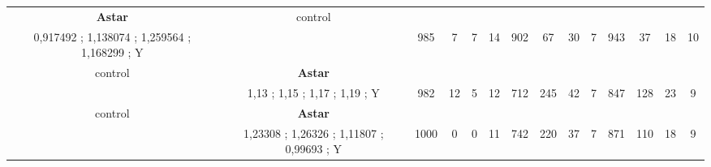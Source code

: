 \begin{table}[H]
{\begin{tabular}{|c|c|c|c|c|c|c|c|c|c|c|c|c|c|}
\cellcolor{blue!15}\textbf{Astar} & control& {\color[HTML]{00009B} } & {\color[HTML]{9A0000} } & {\color[HTML]{009901} } &  & {\color[HTML]{00009B} } & {\color[HTML]{9A0000} } & {\color[HTML]{009901} } &  & {\color[HTML]{00009B} } & {\color[HTML]{9A0000} } & {\color[HTML]{009901} } &  \\ 
\cellcolor{ blue!15}0,917492 ; 1,138074 ; 1,259564 ; 1,168299 ; Y &  & \multirow{-2}{*}{{\color[HTML]{00009B} 985}} & \multirow{-2}{*}{{\color[HTML]{9A0000} 7}} & \multirow{-2}{*}{{\color[HTML]{009901} 7}} & \multirow{-2}{*}{14} & \multirow{-2}{*}{{\color[HTML]{00009B} 902}} & \multirow{-2}{*}{{\color[HTML]{9A0000} 67}} & \multirow{-2}{*}{{\color[HTML]{009901} 30}} & \multirow{-2}{*}{7} & \multirow{-2}{*}{{\color[HTML]{00009B} 943}} & \multirow{-2}{*}{{\color[HTML]{9A0000} 37}} & \multirow{-2}{*}{{\color[HTML]{009901} 18}} & \multirow{-2}{*}{10} \\ \hline

control & \cellcolor{blue!15}\textbf{Astar}& {\color[HTML]{00009B} } & {\color[HTML]{9A0000} } & {\color[HTML]{009901} } &  & {\color[HTML]{00009B} } & {\color[HTML]{9A0000} } & {\color[HTML]{009901} } &  & {\color[HTML]{00009B} } & {\color[HTML]{9A0000} } & {\color[HTML]{009901} } &  \\ 
 & \cellcolor{ blue!15}1,13 ; 1,15 ; 1,17 ; 1,19 ; Y & \multirow{-2}{*}{{\color[HTML]{00009B} 982}} & \multirow{-2}{*}{{\color[HTML]{9A0000} 12}} & \multirow{-2}{*}{{\color[HTML]{009901} 5}} & \multirow{-2}{*}{12} & \multirow{-2}{*}{{\color[HTML]{00009B} 712}} & \multirow{-2}{*}{{\color[HTML]{9A0000} 245}} & \multirow{-2}{*}{{\color[HTML]{009901} 42}} & \multirow{-2}{*}{7} & \multirow{-2}{*}{{\color[HTML]{00009B} 847}} & \multirow{-2}{*}{{\color[HTML]{9A0000} 128}} & \multirow{-2}{*}{{\color[HTML]{009901} 23}} & \multirow{-2}{*}{9} \\ \hline

control & \cellcolor{blue!15}\textbf{Astar}& {\color[HTML]{00009B} } & {\color[HTML]{9A0000} } & {\color[HTML]{009901} } &  & {\color[HTML]{00009B} } & {\color[HTML]{9A0000} } & {\color[HTML]{009901} } &  & {\color[HTML]{00009B} } & {\color[HTML]{9A0000} } & {\color[HTML]{009901} } &  \\ 
 & \cellcolor{ blue!15}1,23308 ; 1,26326 ; 1,11807 ; 0,99693 ; Y & \multirow{-2}{*}{{\color[HTML]{00009B} 1000}} & \multirow{-2}{*}{{\color[HTML]{9A0000} 0}} & \multirow{-2}{*}{{\color[HTML]{009901} 0}} & \multirow{-2}{*}{11} & \multirow{-2}{*}{{\color[HTML]{00009B} 742}} & \multirow{-2}{*}{{\color[HTML]{9A0000} 220}} & \multirow{-2}{*}{{\color[HTML]{009901} 37}} & \multirow{-2}{*}{7} & \multirow{-2}{*}{{\color[HTML]{00009B} 871}} & \multirow{-2}{*}{{\color[HTML]{9A0000} 110}} & \multirow{-2}{*}{{\color[HTML]{009901} 18}} & \multirow{-2}{*}{9} \\ \hline


\end{tabular}}
\end{table}

